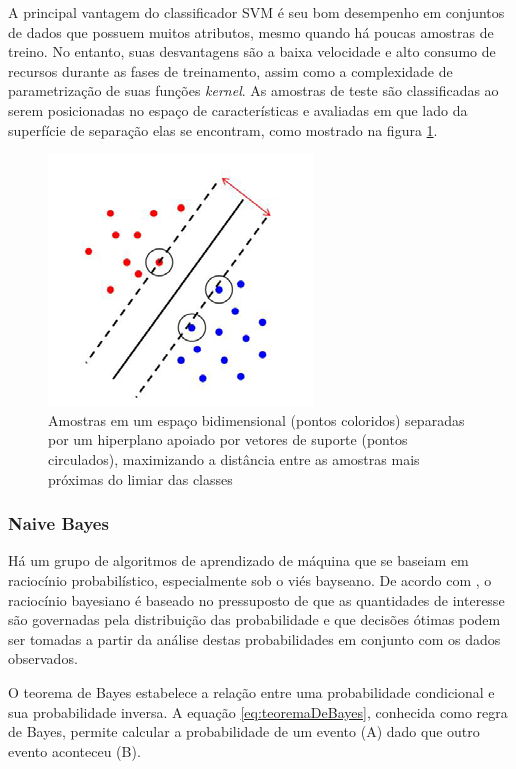A principal vantagem do classificador SVM é seu bom desempenho em conjuntos de dados que possuem muitos atributos, mesmo quando há poucas amostras de treino. No entanto, suas desvantagens são a baixa velocidade e alto consumo de recursos durante as fases de treinamento, assim como a complexidade de parametrização de suas funções \textit{kernel}. As amostras de teste são classificadas ao serem posicionadas no espaço de características e avaliadas em que lado da superfície de separação elas se encontram, como mostrado na figura \ref{fig:svm}.

\begin{figure}[h!]
  \centering
  \includegraphics[scale=0.5]{imgs/svm}
  \caption[Máquina de vetores de suporte]{Amostras em um espaço bidimensional (pontos coloridos) separadas por um hiperplano apoiado por vetores de suporte (pontos circulados), maximizando a distância entre as amostras mais próximas do limiar das classes}
  \label{fig:svm}
\end{figure}

\subsubsection*{Naive Bayes}

Há um grupo de algoritmos de aprendizado de máquina que se baseiam em raciocínio probabilístico, especialmente sob o viés bayseano. De acordo com , o raciocínio bayesiano é baseado no pressuposto de que as quantidades de interesse são governadas pela distribuição das probabilidade e que decisões ótimas podem ser tomadas a partir da análise destas probabilidades em conjunto com os dados observados.

O teorema de Bayes estabelece a relação entre uma probabilidade condicional e sua probabilidade inversa. A equação \ref{eq:teoremaDeBayes}, conhecida como regra de Bayes, permite calcular a probabilidade de um evento (A) dado que outro evento aconteceu (B).

